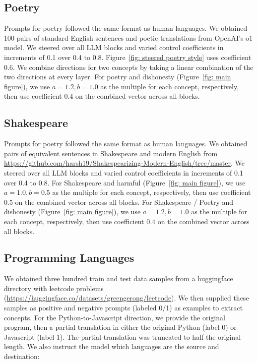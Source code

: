\subsection{Poetry} Prompts for poetry followed the same format as human languages. We obtained 100 pairs of standard English sentences and poetic translations from OpenAI's o1 model. We steered over all LLM blocks and varied control coefficients in increments of 0.1 over 0.4 to 0.8. Figure~\ref{fig: steered poetry style} uses coefficient 0.6. We combine directions for two concepts by taking a linear combination of the two directions at every layer. For poetry and dishonesty (Figure~\ref{fig: main figure}), we use $a=1.2,b=1.0$ as the multiple for each concept, respectively, then use coefficient $0.4$ on the combined vector across all blocks. 

\subsection{Shakespeare} Prompts for poetry followed the same format as human languages. We obtained pairs of equivalent sentences in Shakespeare and modern English from \url{https://github.com/harsh19/Shakespearizing-Modern-English/tree/master}. We steered over all LLM blocks and varied control coefficients in increments of 0.1 over 0.4 to 0.8. For Shakespeare and harmful (Figure~\ref{fig: main figure}), we use $a=1.0,b=0.5$ as the multiple for each concept, respectively, then use coefficient $0.5$ on the combined vector across all blocks. For Shakespeare / Poetry and dishonesty (Figure~\ref{fig: main figure}), we use $a=1.2,b=1.0$ as the multiple for each concept, respectively, then use coefficient $0.4$ on the combined vector across all blocks.

\subsection{Programming Languages}

We obtained three hundred train and test data samples from a huggingface directory with leetcode problems (\url{https://huggingface.co/datasets/greengerong/leetcode}). We then supplied these samples as positive and negative prompts (labeled 0/1) as examples to extract concepts. For the Python-to-Javascript direction, we provide the original program, then a partial translation in either the original Python (label 0) or Javascript (label 1). The partial translation was truncated to half the original length. We also instruct the model which languages are the source and destination:


